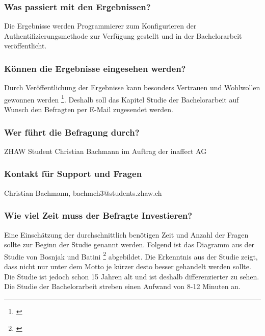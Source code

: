 \subsubsection{Was passiert mit den
Ergebnissen?}\label{was-passiert-mit-den-ergebnissen}

Die Ergebnisse werden Programmierer zum Konfigurieren der
Authentifizierungsmethode zur Verfügung gestellt und in der
Bachelorarbeit veröffentlicht.

\subsubsection{Können die Ergebnisse eingesehen
werden?}\label{kuxf6nnen-die-ergebnisse-eingesehen-werden}

Durch Veröffentlichung der Ergebnisse kann besonders Vertrauen und
Wohlwollen gewonnen werden \footnote{\autocite{fragebogen}}. Deshalb
soll das Kapitel Studie der Bachelorarbeit auf Wunsch den Befragten per
E-Mail zugesendet werden.

\subsubsection{Wer führt die Befragung
durch?}\label{wer-fuxfchrt-die-befragung-durch}

ZHAW Student Christian Bachmann im Auftrag der inaffect AG

\subsubsection{Kontakt für Support und
Fragen}\label{kontakt-fuxfcr-support-und-fragen}

Christian Bachmann, bachmch3@students.zhaw.ch

\subsubsection{Wie viel Zeit muss der Befragte
Investieren?}\label{wie-viel-zeit-muss-der-befragte-investieren}

Eine Einschätzung der durchschnittlich benötigen Zeit und Anzahl der
Fragen sollte zur Beginn der Studie genannt werden. Folgend ist das
Diagramm aus der Studie von Bosnjak und Batini \footnote{\autocite{bosnjak}}
abgebildet. Die Erkenntnis aus der Studie zeigt, dass nicht nur unter
dem Motto je kürzer desto besser gehandelt werden sollte. Die Studie ist
jedoch schon 15 Jahren alt und ist deshalb differenzierter zu sehen. Die
Studie der Bachelorarbeit streben einen Aufwand von 8-12 Minuten an.

